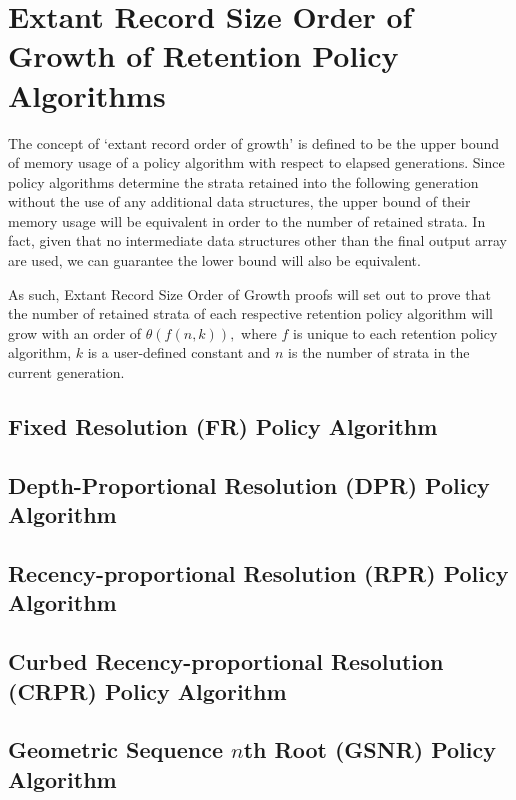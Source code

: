 \printunsrtglossary[numberedsection=autolabel]

\section{Extant Record Size Order of Growth of Retention Policy Algorithms} \label{sec:extant_record_oog}
The concept of `extant record order of growth' is defined to be the upper bound of memory usage of a policy algorithm with respect to elapsed generations.
Since policy algorithms determine the strata retained into the following generation without the use of any additional data structures, the upper bound of their memory usage will be equivalent in order to the number of retained strata.
In fact, given that no intermediate data structures other than the final output array are used, we can guarantee the lower bound will also be equivalent.

As such, Extant Record Size Order of Growth proofs will set out to prove that the number of retained strata of each respective retention policy algorithm will grow with an order of $\mathcal{\theta}(f(n, k)),$ where $f$ is unique to each retention policy algorithm, $k$ is a user-defined constant and $n$ is the number of strata in the current generation.

\subsection{Fixed Resolution (FR) Policy Algorithm}





\subsection{Depth-Proportional Resolution (DPR) Policy Algorithm}



\subsection{Recency-proportional Resolution (RPR) Policy Algorithm}




\subsection{Curbed Recency-proportional Resolution (CRPR) Policy Algorithm}

\subsection{Geometric Sequence $n$th Root (GSNR) Policy Algorithm}

